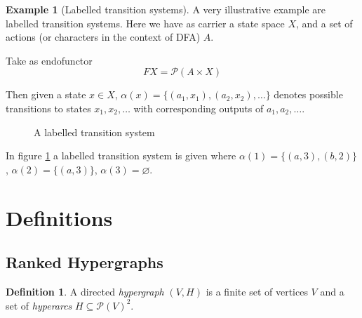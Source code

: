 \documentclass[12pt]{article}
\theoremstyle{definition}
\newtheorem{definition}[theorem]{Definition}
\newtheorem{example}[theorem]{Example}
\renewcommand{\P}{\mathcal{P}}
\newcommand{\1}{\mathbbm{1}}
\begin{document}
\begin{example}[Labelled transition systems]
    A very illustrative example are labelled transition systems. Here we have as carrier a state space $X$, and a set of actions (or characters in the context of DFA) $A$.

    Take as endofunctor 
    \[
        FX = \P(A\times X)
    \]

    Then given a state $x\in X$, $\alpha(x) = \{(a_1, x_1),(a_2, x_2), \dots\}$ denotes possible transitions to states $x_1, x_2, \dots$ with corresponding outputs of $a_1, a_2, \dots$.
    \begin{figure}[h]
        \centering
        \label{ex-lab_tran_sys}
        \caption{A labelled transition system}
    \end{figure}

    In figure \ref{ex-lab_tran_sys} a labelled transition system is given where $\alpha(1) = \{(a,3),(b,2)\}$, $\alpha(2) = \{(a,3)\}$, $\alpha(3) = \varnothing$.
\end{example}

\newpage
\section{Definitions}
\subsection{Ranked Hypergraphs}
\begin{definition}
    A directed \emph{hypergraph} $(V,H)$ is a finite set of vertices $V$ and a set of \emph{hyperarcs} $H\subseteq \P(V)^2$.
\end{definition}
\end{document}
